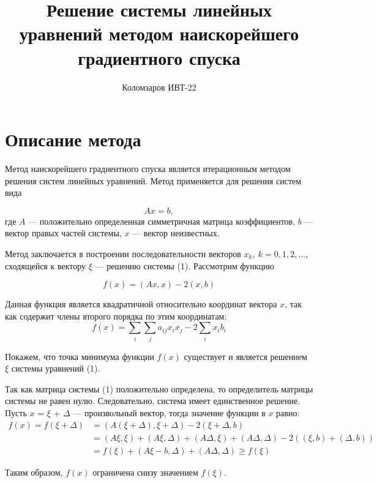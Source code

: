 \documentclass{article}
\title{Решение системы линейных уравнений методом наискорейшего градиентного спуска}
\author{Коломзаров ИВТ-22}
\begin{document}
\maketitle

\section{Описание метода}

  
Метод наискорейшего градиентного спуска является итерационным методом решения систем линейных уравнений.
Метод применяется для решения систем вида 

\begin{equation}
    Ax = b,
\end{equation}
где $A$ --- положительно определенная симметричная матрица коэффициентов, $b$ --- вектор правых частей 
системы, $x$ --- вектор неизвестных.  


Метод заключается в построении последовательности векторов ${x_k}, \ k = 0, 1, 2, \dots$, сходящейся к
вектору $\xi$ --- решению системы (1). Рассмотрим функцию 

\begin{equation}
    f(x) = (Ax, x) - 2 (x, b)
\end{equation}  

Данная функция является квадратичной относительно координат вектора $x$, так как содержит 
члены второго порядка по этим координатам:
\begin{equation*}
    f(x) = \sum_{i} \sum_j a_{ij} x_i x_j - 2 \sum_i x_i b_i
\end{equation*}  


Покажем, что точка минимума функции $f(x)$ существует и является решением $\xi$ системы уравнений (1).  


Так как матрица системы (1) положительно определена, то определитель матрицы системы не равен нулю. Следовательно, система имеет единственное решение. Пусть $x$ = $\xi$ + $\Delta$ --- произвольный вектор,
тогда значение функции в $x$ равно:
\begin{align*}
    f(x) = f(\xi + \Delta) &= (A(\xi + \Delta), \xi + \Delta) - 2(\xi + \Delta, b) \\
    &= (A \xi, \xi) + (A \xi, \Delta) + (A \Delta, \xi) + (A \Delta, \Delta) - 
    2((\xi, b) + (\Delta, b)) \\
    &= f(\xi) + (A \xi - b, \Delta) + (A \Delta, \Delta) \geq f(\xi)
\end{align*}

Таким образом, $f(x)$ ограничена снизу значением $f(\xi)$. 
\end{document}
